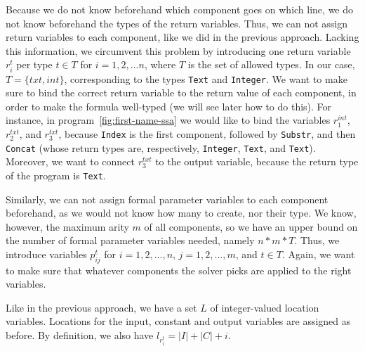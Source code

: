 Because we do not know beforehand which component goes on which line, we do not
know beforehand the types of the return variables. Thus, we
can not assign return variables to each component, like we did in the previous
approach. Lacking this information, we circumvent this problem by introducing
one return variable $r_i^t$ per type $t \in T$ for $i = 1, 2, ... n$, where $T$
is the set of allowed types. In our case, $T = \{txt, int\}$, corresponding to
the types \lstinline{Text} and \lstinline{Integer}. We want to make sure to bind
the correct return variable to the return value of each component, in order to
make the formula well-typed (we will see later how to do this). For instance, in
program~\ref{fig:first-name-ssa} we would like to bind the variables
$r_1^{int}$, $r_2^{txt}$, and $r_3^{txt}$, because \lstinline{Index} is the
first component, followed by \lstinline{Substr}, and then \lstinline{Concat}
(whose return types are, respectively, \lstinline{Integer}, \lstinline{Text},
and \lstinline{Text}). Moreover, we want to connect $r_3^{txt}$ to the output
variable, because the return type of the program is \lstinline{Text}.

Similarly, we can not assign formal parameter variables to each component
beforehand, as we would not know how many to create, nor their type. We know,
however, the maximum arity $m$ of all components, so we have an upper bound on
the number of formal parameter variables needed, namely $n * m * T$. Thus, we
introduce variables $p_{ij}^t$ for $i = 1, 2, ..., n$, $j = 1, 2, ..., m$, and
$t \in T$. Again, we want to make sure that whatever components the solver
picks are applied to the right variables.

Like in the previous approach, we have a set $L$ of integer-valued location
variables. Locations for the input, constant and output variables are assigned
as before. By definition, we also have $l_{r_i^t} = |I| + |C| + i$.